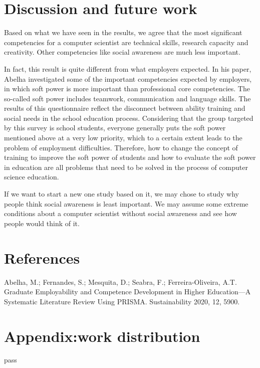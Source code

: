 \documentclass[conference]{IEEEtran}
\begin{document}
\section{Discussion and future work}
\par Based on what we have seen in the results, we agree that the most significant competencies for a computer scientist are technical skills, research capacity and creativity. Other competencies like social awareness are much less important.
\par In fact, this result is quite different from what employers expected. In his paper, Abelha\cite{b1} investigated some of the important competencies expected by employers, in which soft power is more important than professional core competencies. The so-called soft power includes teamwork, communication and language skills. The results of this questionnaire reflect the disconnect between ability training and social needs in the school education process. Considering that the group targeted by this survey is school students, everyone generally puts the soft power mentioned above at a very low priority, which to a certain extent leads to the problem of employment difficulties. Therefore, how to change the concept of training to improve the soft power of students and how to evaluate the soft power in education are all problems that need to be solved in the process of computer science education.
\par If we want to start a new one study based on it, we may chose to study why people think social awareness is least important. We may assume some extreme conditions about a computer scientist without social awareness and see how people would think of it.

\section{References}
\begin{thebibliography}{}
 Abelha, M.; Fernandes, S.; Mesquita, D.; Seabra, F.; Ferreira-Oliveira, A.T. Graduate Employability and Competence Development in Higher Education—A Systematic Literature Review Using PRISMA. Sustainability 2020, 12, 5900.
\end{thebibliography}


\section{Appendix:work distribution}
pass
\end{document}
